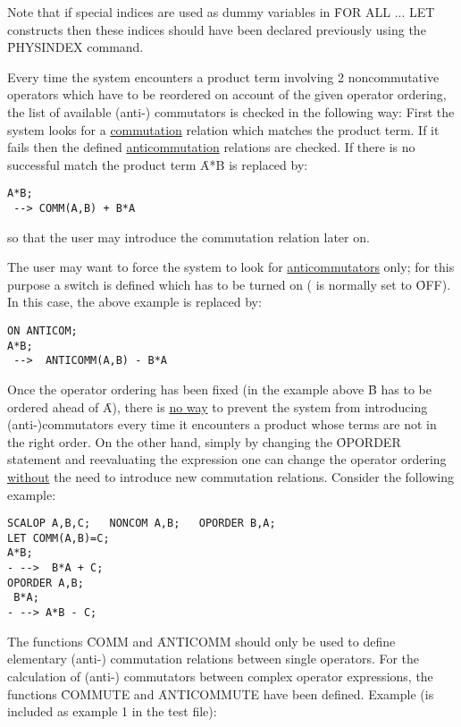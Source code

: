 Note that if special indices are used as dummy variables in
\f{FOR ALL ... LET} constructs then these indices should  have been
declared previously using the \f{PHYSINDEX} command.

Every time the system
encounters a product term involving 2
noncommutative operators which have to be reordered on account of the
given operator ordering, the list of available (anti-) commutators is
checked in the following way: First the system looks for a
\underline{commutation} relation which matches the  product term. If it
fails then the defined \underline{anticommutation} relations are
checked. If there is no successful match the product term
 \f{A*B} is replaced by: 

\begin{verbatim}
A*B;
 --> COMM(A,B) + B*A
\end{verbatim}
so that the user may introduce the commutation relation later on.

\hypertarget{switch:ANTICOM}{}
The user may want to force the system to look for
\underline{anticommutators} only; for this purpose a switch 
is defined which has to be turned on ( is normally set to
\f{OFF}). In this case, the above example is replaced by: 

\begin{verbatim}
ON ANTICOM;
A*B;
 -->  ANTICOMM(A,B) - B*A
\end{verbatim}

Once the operator ordering has been fixed (in the example above \f{B}
has to be ordered ahead of \f{A}),
there is \underline{no way} to prevent the
system from introducing (anti-)commutators  every time it encounters
a product whose terms are not in the right order. On the other hand,
simply by changing the \f{OPORDER} statement  and reevaluating the
expression one can change  the operator ordering
\underline{without}
the need to introduce new commutation relations.
Consider the following example: 

\begin{verbatim}
SCALOP A,B,C;   NONCOM A,B;   OPORDER B,A;
LET COMM(A,B)=C;
A*B;
- -->  B*A + C;
OPORDER A,B;
 B*A;
- --> A*B - C;
\end{verbatim}

The functions \f{COMM} and \f{ANTICOMM} should only be used  to
define
elementary (anti-) commutation relations between single operators.
For the calculation of (anti-) commutators between complex
operator
expressions, the functions \f{COMMUTE}  and
\f{ANTICOMMUTE}  have been defined.
Example (is included as example 1 in the test file): 

